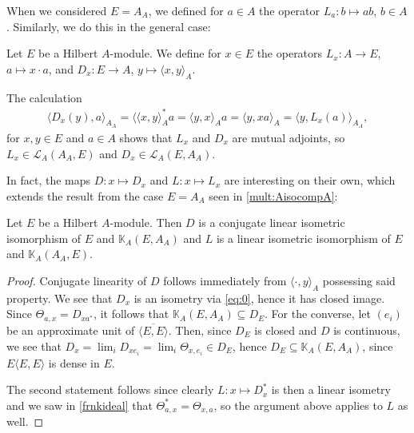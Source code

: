 When we considered $E=A_A$, we defined for $a \in A$ the operator $L_a\colon b \mapsto ab$, $b \in A$. Similarly, we do this in the general case:
\begin{definition}
	Let $E$ be a Hilbert $A$-module. We define for $x \in E$ the operators $L_x\colon A \to E$, $a \mapsto x \cdot a$, and $D_x \colon E \to A$, $y \mapsto \langle x,y\rangle_A$.
\end{definition}
\begin{remark}
The calculation	
\begin{align*}
	\langle D_x(y), a \rangle_{A_A} = \langle \langle x,y\rangle_A^*a = \langle y,x \rangle_A a = \langle y , x a \rangle_A = \langle y, L_x(a)\rangle_{A_A},
\end{align*}
for $x,y \in E$ and $a \in A$ shows that $L_x$ and $D_x$ are mutual adjoints, so $L_x \in \mathcal{L}_A(A_A,E)$ and $D_x \in \mathcal{L}_A(E,A_A)$.
\end{remark}
In fact, the maps $D \colon x \mapsto D_x$ and $L \colon x \mapsto L_x$ are interesting on their own, which extends the result from the case $E=A_A$ seen in \ref{mult:AisocompA}:
\begin{lemma}
	Let $E$ be a Hilbert $A$-module. Then $D$ is a conjugate linear isometric isomorphism of $E$ and $\mathbb{K}_A(E,A_A)$ and $L$ is a linear isometric isomorphism of $E$ and $\mathbb{K}_A(A_A,E)$.
	\label{mult:isocompactgen}
\end{lemma}
\begin{proof}
	Conjugate linearity of $D$ follows immediately from $\langle \cdot, y \rangle_A$ possessing said property. We see that $D_x$ is an isometry via \cref{eq:0}, hence it has closed image. Since $\Theta_{a,x} = D_{x a^*}$, it follows that $\mathbb{K}_A(E,A_A) \subseteq D_{E}$. For the converse, let $(e_i)$ be an approximate unit of $\overline{\langle E,E\rangle}$. Then, since $D_E$ is closed and $D$ is continuous, we see that $D_x=\lim_i D_{xe_i} = \lim_i \Theta_{x,e_i} \in D_E$, hence $D_E \subseteq \mathbb{K}_A(E,A_A)$, since $E \langle E,E\rangle$ is dense in $E$.	
	
	The second statement follows since clearly $L \colon x \mapsto D_x^*$ is then a linear isometry and we saw in \ref{frnkideal} that $\Theta_{a,x}^* = \Theta_{x,a}$, so the argument above applies to $L$ as well.
\end{proof}

